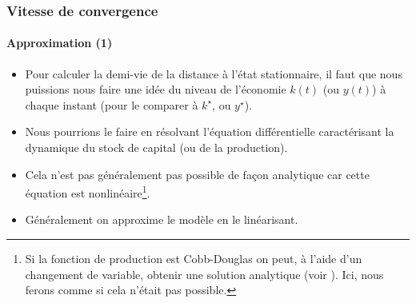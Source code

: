 \documentclass[10pt,notheorems]{beamer}
\theoremstyle{plain}
\theoremstyle{definition} %
\begin{document}
\begin{frame}
  \frametitle{Vitesse de convergence}
  \framesubtitle{Approximation (1)}

  \begin{itemize}

  \item Pour calculer la demi-vie de la distance à l'état stationnaire, il faut
    que nous puissions nous faire une idée du niveau de l'économie $k(t)$ (ou
    $y(t)$) à chaque instant (pour le comparer à $k^\star$, ou
    $y^{\star}$).\newline

  \item Nous pourrions le faire en résolvant l'équation différentielle
    caractérisant la dynamique du stock de capital (ou de la
    production).\newline

  \item Cela n'est pas généralement pas possible de façon analytique car cette
    équation est nonlinéaire\footnote[frame]{Si la fonction de production est
      Cobb-Douglas on peut, à l'aide d'un changement de variable, obtenir une solution analytique (voir
      \href{https://stephane-adjemian.fr/posts/simulation-du-modele-de-solow/}{}).
      Ici, nous ferons comme si cela n'était pas possible.}.\newline

  \item Généralement on approxime le modèle en le linéarisant.

  \end{itemize}

\end{frame}
\end{document}
